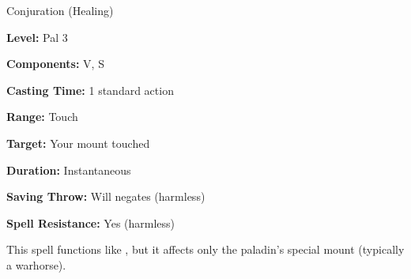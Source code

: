 
Conjuration (Healing)

\textbf{Level:} Pal 3

\textbf{Components:} V, S

\textbf{Casting Time:} 1 standard action

\textbf{Range:} Touch

\textbf{Target:} Your mount touched

\textbf{Duration:} Instantaneous

\textbf{Saving Throw:} Will negates (harmless)

\textbf{Spell Resistance:} Yes (harmless)

This spell functions like , but it affects only the paladin's special 
mount (typically a warhorse).

